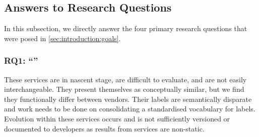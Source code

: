 \subsection{Answers to Research Questions}

In this subsection, we directly answer the four primary research questions that were posed in \cref{sec:introduction:goals}.

\subsubsection[Answering RQ1]{RQ1: ``\RQOneTextLandscapeAnalysis{}''}
\begin{callout}
These services are in nascent stage, are difficult to evaluate, and are not easily interchangeable. They present themselves as conceptually similar, but we find they functionally differ between vendors. Their labels are semantically disparate and work needs to be done on consolidating a standardised vocabulary for labels. Evolution within these services occurs and is not sufficiently versioned or documented to developers as results from services are non-static.
\end{callout}


